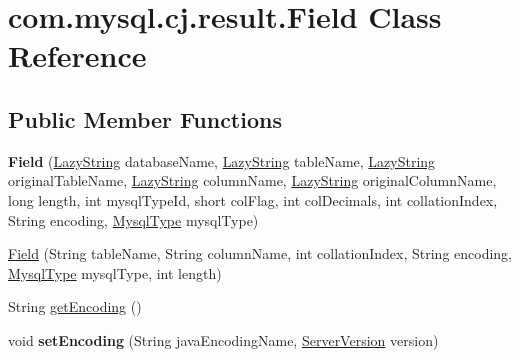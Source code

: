 \hypertarget{classcom_1_1mysql_1_1cj_1_1result_1_1_field}{}\section{com.\+mysql.\+cj.\+result.\+Field Class Reference}
\label{classcom_1_1mysql_1_1cj_1_1result_1_1_field}
\subsection*{Public Member Functions}
\begin{DoxyCompactItemize}
\item 
\mbox{\label{classcom_1_1mysql_1_1cj_1_1result_1_1_field_ab848d3e583a486ff56d0892152bcf8d0}} 
{\bfseries Field} (\mbox{\hyperlink{classcom_1_1mysql_1_1cj_1_1util_1_1_lazy_string}{Lazy\+String}} database\+Name, \mbox{\hyperlink{classcom_1_1mysql_1_1cj_1_1util_1_1_lazy_string}{Lazy\+String}} table\+Name, \mbox{\hyperlink{classcom_1_1mysql_1_1cj_1_1util_1_1_lazy_string}{Lazy\+String}} original\+Table\+Name, \mbox{\hyperlink{classcom_1_1mysql_1_1cj_1_1util_1_1_lazy_string}{Lazy\+String}} column\+Name, \mbox{\hyperlink{classcom_1_1mysql_1_1cj_1_1util_1_1_lazy_string}{Lazy\+String}} original\+Column\+Name, long length, int mysql\+Type\+Id, short col\+Flag, int col\+Decimals, int collation\+Index, String encoding, \mbox{\hyperlink{enumcom_1_1mysql_1_1cj_1_1_mysql_type}{Mysql\+Type}} mysql\+Type)
\item 
\mbox{\hyperlink{classcom_1_1mysql_1_1cj_1_1result_1_1_field_a33e583bba81e01de1067f68e0a0c0e4a}{Field}} (String table\+Name, String column\+Name, int collation\+Index, String encoding, \mbox{\hyperlink{enumcom_1_1mysql_1_1cj_1_1_mysql_type}{Mysql\+Type}} mysql\+Type, int length)
\item 
String \mbox{\hyperlink{classcom_1_1mysql_1_1cj_1_1result_1_1_field_a35ed1500146aaf3c66c9b8912318a210}{get\+Encoding}} ()
\item 
\mbox{\label{classcom_1_1mysql_1_1cj_1_1result_1_1_field_a15ab864bf941a4eacc993a63378f9891}} 
void {\bfseries set\+Encoding} (String java\+Encoding\+Name, \mbox{\hyperlink{classcom_1_1mysql_1_1cj_1_1_server_version}{Server\+Version}} version)
\item 
\mbox{\label{classcom_1_1mysql_1_1cj_1_1result_1_1_field_a8cb0ae5fe9a52cb5cd1c6f956127194f}} 

\end{DoxyCompactItemize}
